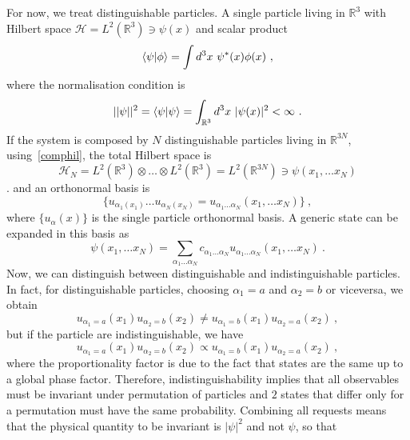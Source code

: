     For now, we treat distinguishable particles. A single particle living in $\mathbb R^3$ with Hilbert space $\mathcal H = L^2 (\mathbb R^3) \ni \psi(x)$ and scalar product
    \begin{equation*}
        \langle\psi\vert\phi\rangle = \int d^3 x ~ \psi^*(x) \phi(x) ~,
    \end{equation*}
    where the normalisation condition is 
    \begin{equation*}
        ||\psi||^2 = \langle\psi\vert\psi\rangle = \int_{\mathbb R^3} d^3 x ~ |\psi(x)|^2 < \infty ~.
    \end{equation*}
    If the system is composed by $N$ distinguishable particles living in $\mathbb R^{3N}$, using~\eqref{comphil}, the total Hilbert space is 
    \begin{equation*}
        \mathcal H_N = L^2(\mathbb R^3) \otimes \ldots \otimes L^2(\mathbb R^3) = L^2 (\mathbb R^{3N}) \ni \psi(x_1, \ldots x_N)
    \end{equation*}. 
    and an orthonormal basis is 
    \begin{equation*}
        \{u_{\alpha_1 (x_1)} \ldots u_{\alpha_N (x_N)} = u_{\alpha_1 \ldots \alpha_N} (x_1, \ldots x_N)\} ~,
    \end{equation*} 
    where $\{u_\alpha (x)\}$ is the single particle orthonormal basis. A generic state can be expanded in this basis as 
    \begin{equation*}
        \psi(x_1, \ldots x_N) = \sum_{\alpha_1 \ldots \alpha_N} c_{\alpha_1 \ldots \alpha_N} u_{\alpha_1 \ldots \alpha_N} (x_1, \ldots x_N) ~.
    \end{equation*}
    Now, we can distinguish between distinguishable and indistinguishable particles. In fact, for distinguishable particles, choosing $\alpha_1 = a$ and $\alpha_2 = b$ or viceversa, we obtain
    \begin{equation*}
        u_{\alpha_1 = a} (x_1) u_{\alpha_2 = b} (x_2) \neq u_{\alpha_1 = b} (x_1) u_{\alpha_2 = a} (x_2) ~,
    \end{equation*}
    but if the particle are indistinguishable, we have 
    \begin{equation*}
        u_{\alpha_1 = a} (x_1) u_{\alpha_2 = b} (x_2) \propto u_{\alpha_1 = b} (x_1) u_{\alpha_2 = a} (x_2) ~,
    \end{equation*}
    where the proportionality factor is due to the fact that states are the same up to a global phase factor. Therefore, indistinguishability implies that all observables must be invariant under permutation of particles and $2$ states that differ only for a permutation must have the same probability. Combining all requests means that the physical quantity to be invariant is $|\psi|^2$ and not $\psi$, so that 
